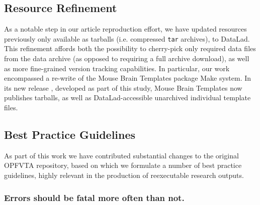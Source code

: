 \subsection{Resource Refinement}

As a notable step in our article reproduction effort, we have updated resources previously only available as tarballs (i.e. compressed \texttt{tar} archives), to DataLad.
This refinement affords both the possibility to cherry-pick only required data files from the data archive (as opposed to requiring a full archive download), as well as more fine-grained version tracking capabilities.
In particular, our work encompassed a re-write of the Mouse Brain Templates package \cite{mbt05} Make system.
In its new release \cite{mbt10}, developed as part of this study, Mouse Brain Templates now publishes tarballs, as well as DataLad-accessible unarchived individual template files.


\subsection{Best Practice Guidelines}

As part of this work we have contributed substantial changes to the original OPFVTA repository, based on which we formulate a number of best practice guidelines, highly relevant in the production of reexecutable research outputs.

\subsubsection{Errors should be fatal more often than not.}

